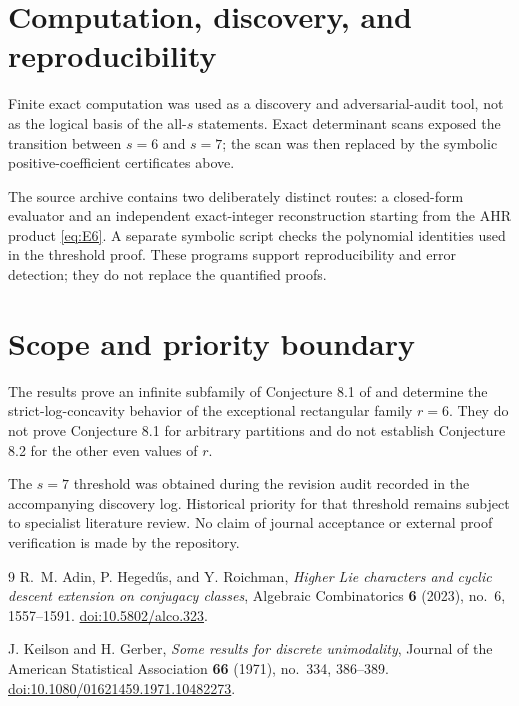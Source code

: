 \documentclass[11pt]{amsart}
\begin{document}
\section{Computation, discovery, and reproducibility}
Finite exact computation was used as a discovery and adversarial-audit tool, not as the logical basis of the all-\(s\) statements. Exact determinant scans exposed the transition between \(s=6\) and \(s=7\); the scan was then replaced by the symbolic positive-coefficient certificates above.

The source archive contains two deliberately distinct routes: a closed-form evaluator and an independent exact-integer reconstruction starting from the AHR product \eqref{eq:E6}. A separate symbolic script checks the polynomial identities used in the threshold proof. These programs support reproducibility and error detection; they do not replace the quantified proofs.

\section{Scope and priority boundary}
The results prove an infinite subfamily of Conjecture 8.1 of \cite{AHR} and determine the strict-log-concavity behavior of the exceptional rectangular family \(r=6\). They do not prove Conjecture 8.1 for arbitrary partitions and do not establish Conjecture 8.2 for the other even values of \(r\).

The \(s=7\) threshold was obtained during the revision audit recorded in the accompanying discovery log. Historical priority for that threshold remains subject to specialist literature review. No claim of journal acceptance or external proof verification is made by the repository.

\begin{thebibliography}{9}
R.~M. Adin, P. Heged\H{u}s, and Y. Roichman,
\emph{Higher Lie characters and cyclic descent extension on conjugacy classes},
Algebraic Combinatorics \textbf{6} (2023), no.~6, 1557--1591.
\href{https://doi.org/10.5802/alco.323}{doi:10.5802/alco.323}.

J. Keilson and H. Gerber,
\emph{Some results for discrete unimodality},
Journal of the American Statistical Association \textbf{66} (1971),
no.~334, 386--389.
\href{https://doi.org/10.1080/01621459.1971.10482273}{doi:10.1080/01621459.1971.10482273}.
\end{thebibliography}
\end{document}
